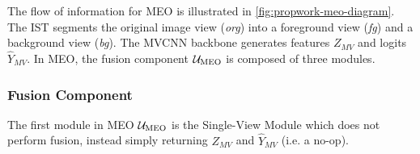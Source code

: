 The flow of information for MEO is illustrated in  \ref{fig:propwork-meo-diagram}. The IST segments the original image view (\textit{org}) into a foreground view (\textit{fg}) and a background view (\textit{bg}). The MVCNN backbone generates features $Z_{MV}$ and logits $\hat{Y}_{MV}$. In MEO, the fusion component $\mathcal{U}_{\text{MEO}}$ is composed of three modules.

\subsubsection{Fusion Component}
The first module in MEO $\mathcal{U}_{\text{MEO}}$ is the Single-View Module which does not perform fusion, instead simply returning $Z_{MV}$ and $\hat{Y}_{MV}$ (i.e. a no-op).

